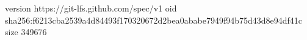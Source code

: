 version https://git-lfs.github.com/spec/v1
oid sha256:f6213cba2539a4d84493f170320672d2bea0ababe7949f94b75d43d8e94df41c
size 349676
